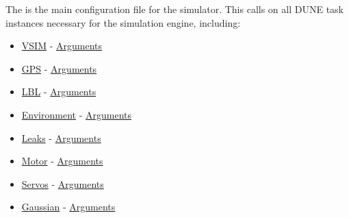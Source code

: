 \documentclass[10pt,a4paper]{article}
\begin{document}
The  is the main configuration file for the simulator. This calls on all DUNE task instances necessary for the simulation engine, including:

\begin{itemize}

\item \href{https://www.lsts.pt/docs/dune/dune-2017.01.0-dmsmw/d2/d2f/structSimulators_1_1VSIM_1_1Task.html}{VSIM} - \href{https://www.lsts.pt/docs/dune/dune-2017.01.0-dmsmw/d3/d5d/structSimulators_1_1VSIM_1_1Arguments.html}{Arguments}

\item \href{https://www.lsts.pt/docs/dune/dune-2017.01.0-dmsmw/db/da2/structSimulators_1_1GPS_1_1Task.html}{GPS} - \href{https://www.lsts.pt/docs/dune/dune-2017.01.0-dmsmw/d1/dd3/structSimulators_1_1GPS_1_1Arguments.html}{Arguments}

\item \href{https://www.lsts.pt/docs/dune/dune-2017.01.0-dmsmw/d0/dd2/structSimulators_1_1LBL_1_1Task.html}{LBL} - \href{https://www.lsts.pt/docs/dune/dune-2017.01.0-dmsmw/d4/dde/structSimulators_1_1LBL_1_1Arguments.html}{Arguments}

\item \href{https://www.lsts.pt/docs/dune/dune-2017.01.0-dmsmw/db/d16/structSimulators_1_1Environment_1_1Task.html}{Environment} - \href{https://www.lsts.pt/docs/dune/dune-2017.01.0-dmsmw/d1/d85/structSimulators_1_1Environment_1_1Arguments.html}{Arguments}

\item \href{https://www.lsts.pt/docs/dune/dune-2017.01.0-dmsmw/d2/d45/structSimulators_1_1Leaks_1_1Task.html}{Leaks} - \href{https://www.lsts.pt/docs/dune/dune-2017.01.0-dmsmw/dd/d5d/structSimulators_1_1Leaks_1_1Arguments.html}{Arguments}

\item \href{https://www.lsts.pt/docs/dune/dune-2017.01.0-dmsmw/d1/d8f/structSimulators_1_1Motor_1_1Task.html}{Motor} - \href{https://www.lsts.pt/docs/dune/dune-2017.01.0-dmsmw/d9/dd8/structSimulators_1_1Motor_1_1Arguments.html}{Arguments}

\item \href{https://www.lsts.pt/docs/dune/dune-2017.01.0-dmsmw/df/d90/structSimulators_1_1Servos_1_1Task.html}{Servos} - \href{https://www.lsts.pt/docs/dune/dune-2017.01.0-dmsmw/d3/dcd/structSimulators_1_1Servos_1_1Arguments.html}{Arguments}

\item \href{https://www.lsts.pt/docs/dune/dune-2017.01.0-dmsmw/d9/d36/structSimulators_1_1Gaussian_1_1Task.html}{Gaussian} - \href{https://www.lsts.pt/docs/dune/dune-2017.01.0-dmsmw/d6/d7b/structSimulators_1_1Gaussian_1_1Arguments.html}{Arguments}
\end{itemize}
\end{document}
